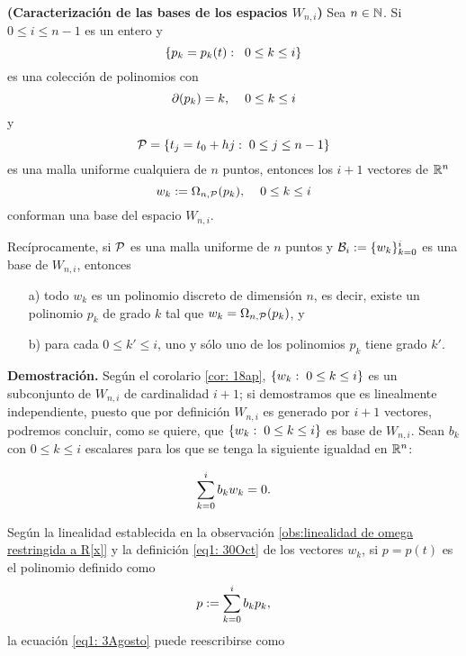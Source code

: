 \begin{prop} \label{Teorema1}
\textbf{(Caracterización de las bases
de los espacios $W_{n,i}$)} Sea $n \in \mathbb{N}$.
Si $0 \leq i \leq n-1$ es un entero y
\[
\{ p_{k}=p_{k}(t): \hspace{0.2cm} 0 \leq k \leq i \}
\]
es una colección de polinomios con
\[
\partial (p_{k})=k, \hspace{0.4cm} 0 \leq k \leq i
\]
y 
\[
\mathcal{P}= \{ t_{j}= t_{0}+hj :\hspace{0.1cm} 0 \leq j \leq n-1 \}
\]
es una malla uniforme cualquiera
de $n$ puntos, entonces los $i+1$ vectores
de $\mathbb{R}^{n}$
\begin{equation}
\label{eq1: 30Oct}
w_{k} := \Omega_{n, \mathcal{P}}(p_{k}), \hspace{0.4cm} 0 \leq k \leq i
\end{equation}
conforman una base del espacio $W_{n,i}$.

Recíprocamente, si $\mathcal{P}$ es una malla uniforme de $n$ puntos y
$\mathcal{B}_{i} := \{ w_{k} \}_{k=0}^{i}$
es una base de $W_{n,i}$, entonces 
\begin{itemize}
	\item[a)] todo $w_{k}$ es un polinomio discreto de dimensión $n$, 
	es decir, existe un polinomio $p_{k}$ de grado $k$ tal que 
	$w_{k} = \Omega_{n, \mathcal{P}}(p_{k})$,	
	y
	\item[b)] para cada $0 \leq k' \leq i$, uno y sólo uno de los polinomios
	$p_{k}$ tiene grado $k'$.
\end{itemize}
\end{prop}
\noindent
\textbf{Demostración.}
Según el corolario \ref{cor: 18ap}, 
$\{ w_{k}: \hspace{0.1cm} 0 \leq k \leq i \}$
es un subconjunto de $W_{n,i}$ de cardinalidad $i+1$; 
si demostramos que es 
linealmente independiente, puesto que por definición
$W_{n,i}$ es generado por $i+1$ vectores, podremos concluir,
como se quiere, que $\{ w_{k}: \hspace{0.1cm} 0 \leq k \leq i \}$
es base de $W_{n,i}$.
Sean $b_{k}$ con $0 \leq k \leq i$ escalares
para los que se tenga la siguiente igualdad en $\mathbb{R}^{n}$:

\begin{equation} \label{eq1: 3Agosto}
\sum\limits_{k=0}^{i}b_{k}w_{k}=0.
\end{equation}

\noindent 
Según la linealidad establecida en la observación
\ref{obs:linealidad de omega restringida a R[x]}
y la definición \eqref{eq1: 30Oct} de los vectores $w_{k}$,
si $p=p(t)$ es el polinomio
definido como
\begin{equation}
\label{eq2: 30Oct}
p:=\sum\limits_{k=0}^{i}b_{k}p_{k},
\end{equation}
la ecuación \eqref{eq1: 3Agosto} puede reescribirse como

